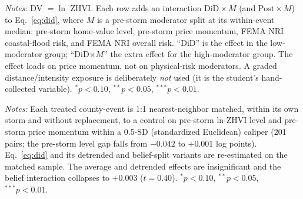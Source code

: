 \documentclass[12pt]{article}
\begin{document}
\begin{table}[htbp]\centering
\begin{threeparttable}
\caption{Heterogeneity of the exposure DiD by observable pre-storm moderators}\label{tab:hetero}\small

\begin{tablenotes}\small\item \textit{Notes:} DV $=\ln$ ZHVI. Each row adds an interaction
$\text{DiD}\times M$ (and $\text{Post}\times M$) to Eq.~\eqref{eq:did}, where $M$ is a pre-storm
moderator split at its within-event median: pre-storm home-value level, pre-storm price momentum,
FEMA NRI coastal-flood risk, and FEMA NRI overall risk. ``DiD'' is the effect in the
low-moderator group; ``DiD$\times M$'' the extra effect for the high-moderator group. The effect
loads on price momentum, not on physical-risk moderators. A graded distance/intensity exposure is
deliberately \emph{not} used (it is the student's hand-collected variable). $^{*}p<0.10$,
$^{**}p<0.05$, $^{***}p<0.01$.
\end{tablenotes}
\end{threeparttable}
\end{table}

\begin{table}[htbp]\centering
\begin{threeparttable}
\caption{Matched difference-in-differences (within-event NN on pre-storm level and momentum)}\label{tab:matched}\small

\begin{tablenotes}\small\item \textit{Notes:} Each treated county-event is 1:1 nearest-neighbor
matched, within its own storm and without replacement, to a control on pre-storm ln-ZHVI level and
pre-storm price momentum within a 0.5-SD (standardized Euclidean) caliper (201 pairs; the
pre-storm level gap falls from $-0.042$ to $+0.001$ log points). Eq.~\eqref{eq:did} and its
detrended and belief-split variants are re-estimated on the matched sample. The average and
detrended effects are insignificant and the belief interaction collapses to $+0.003$ ($t=0.40$).
$^{*}p<0.10$, $^{**}p<0.05$, $^{***}p<0.01$.
\end{tablenotes}
\end{threeparttable}
\end{table}
\end{document}
